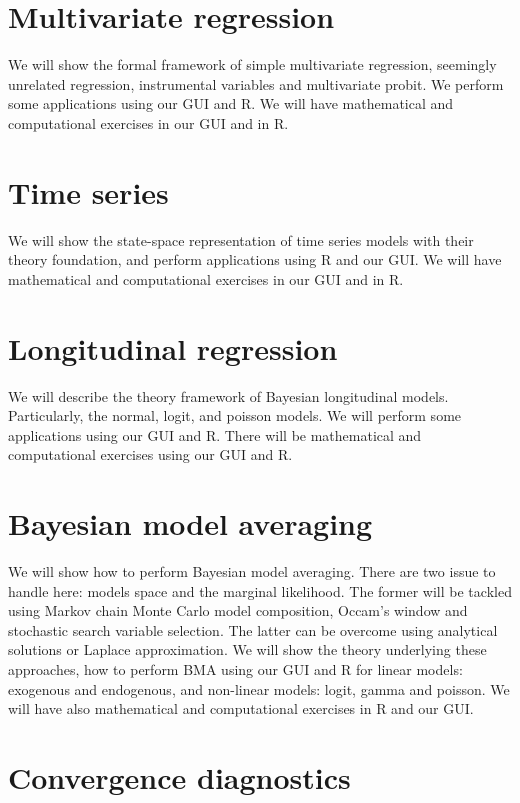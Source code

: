 \documentclass[
]{book}
\begin{document}
\hypertarget{multi}{%
\chapter{Multivariate regression}\label{multi}}

We will show the formal framework of simple multivariate regression, seemingly unrelated regression, instrumental variables and multivariate probit. We perform some applications using our GUI and R. We will have mathematical and computational exercises in our GUI and in R.

\hypertarget{time}{%
\chapter{Time series}\label{time}}

We will show the state-space representation of time series models with their theory foundation, and perform applications using R and our GUI. We will have mathematical and computational exercises in our GUI and in R.

\hypertarget{Longi}{%
\chapter{Longitudinal regression}\label{Longi}}

We will describe the theory framework of Bayesian longitudinal models. Particularly, the normal, logit, and poisson models. We will perform some applications using our GUI and R. There will be mathematical and computational exercises using our GUI and R.

\hypertarget{bma}{%
\chapter{Bayesian model averaging}\label{bma}}

We will show how to perform Bayesian model averaging. There are two issue to handle here: models space and the marginal likelihood. The former will be tackled using Markov chain Monte Carlo model composition, Occam's window and stochastic search variable selection. The latter can be overcome using analytical solutions or Laplace approximation. We will show the theory underlying these approaches, how to perform BMA using our GUI and R for linear models: exogenous and endogenous, and non-linear models: logit, gamma and poisson. We will have also mathematical and computational exercises in R and our GUI.

\hypertarget{diag}{%
\chapter{Convergence diagnostics}\label{diag}}
\end{document}
